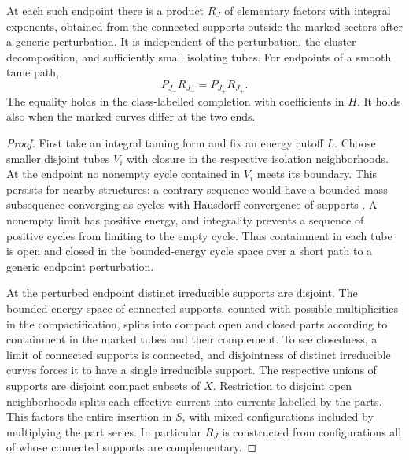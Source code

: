 \begin{proposition}\label{p14-prop:exterior}
At each such endpoint there is a product \(R_J\) of elementary factors
with integral exponents, obtained from the connected supports outside
the marked sectors after a generic perturbation. It is independent
of the perturbation, the cluster decomposition, and sufficiently
small isolating tubes. For endpoints of a smooth tame path,
\begin{equation}\label{p14-eq:conservation}
                    P_{J_-}R_{J_-}=P_{J_+}R_{J_+}.
\end{equation}
The equality holds in the class-labelled completion with coefficients
in \(H\). It holds also when the marked curves differ at the two ends.
\end{proposition}
\begin{proof}
First take an integral taming form and fix an energy cutoff \(L\).
Choose smaller disjoint tubes \(V_i\) with closure in the respective
isolation neighborhoods. At the endpoint no nonempty cycle contained
in \(\overline V_i\) meets its boundary. This persists for nearby
structures: a contrary sequence would have a bounded-mass subsequence
converging as cycles with Hausdorff convergence of supports
\cite[Theorem~2.11]{diw}. A nonempty limit has positive energy, and
integrality prevents a sequence of positive cycles from limiting to
the empty cycle. Thus containment in each tube is open and closed
in the bounded-energy cycle space over a short path to a generic
endpoint perturbation.

At the perturbed endpoint distinct irreducible supports are disjoint.
The bounded-energy space of connected supports, counted with possible
multiplicities in the compactification, splits into compact open and
closed parts according to containment in the marked tubes and their
complement. To see closedness, a limit of connected supports is
connected, and disjointness of distinct irreducible curves forces it to
have a single irreducible support. The respective unions of supports
are disjoint compact subsets of \(X\). Restriction to disjoint open
neighborhoods splits each effective current into currents labelled by
the parts. This factors the entire insertion in \(S\), with mixed
configurations included by multiplying the part series. In particular
\(R_J\) is constructed from configurations all of whose connected
supports are complementary.


\end{proof}
